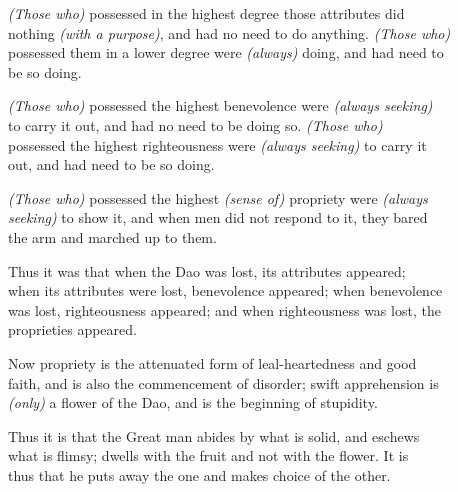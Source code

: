     \textit{(Those who)} possessed in the highest degree those attributes did\\
    nothing \textit{(with a purpose)}, and had no need to do anything. \textit{(Those who)}\\
    possessed them in a lower degree were \textit{(always)} doing, and had need to\\
    be so doing.\vspace{\baselineskip}
    
    \textit{(Those who)} possessed the highest benevolence were \textit{(always seeking)}\\
    to carry it out, and had no need to be doing so. \textit{(Those who)}\\
    possessed the highest righteousness were \textit{(always seeking)} to carry it\\
    out, and had need to be so doing.\vspace{\baselineskip}
    
    \textit{(Those who)} possessed the highest \textit{(sense of)} propriety were \textit{(always\\
    seeking)} to show it, and when men did not respond to it, they bared\\
    the arm and marched up to them.\vspace{\baselineskip}
    
    Thus it was that when the Dao was lost, its attributes appeared;\\
    when its attributes were lost, benevolence appeared; when benevolence\\
    was lost, righteousness appeared; and when righteousness was lost, the\\
    proprieties appeared.\vspace{\baselineskip}
    
    Now propriety is the attenuated form of leal-heartedness and good\\
    faith, and is also the commencement of disorder; swift apprehension is\\
    \textit{(only)} a flower of the Dao, and is the beginning of stupidity.\vspace{\baselineskip}
    
    Thus it is that the Great man abides by what is solid, and eschews\\
    what is flimsy; dwells with the fruit and not with the flower. It is\\
    thus that he puts away the one and makes choice of the other.\vspace{\baselineskip}
\newpage{}
